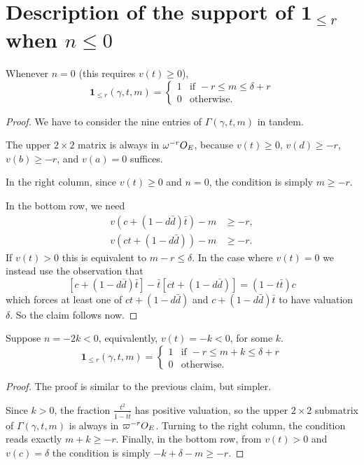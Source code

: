 \section{Description of the support of $\mathbf{1}_{\le r}$ when $n \le 0$}
\begin{proposition}
  Whenever $n = 0$ (this requires $v(t) \geq 0$),
  \[
    \mathbf{1}_{\le r}(\gamma, t, m) =
    \begin{cases}
      1 & \text{if } -r \le m \le \delta+r \\
      0 & \text{otherwise.}
    \end{cases}
  \]
\end{proposition}
\begin{proof}
  We have to consider the nine entries of $\Gamma(\gamma, t, m)$ in tandem.

  The upper $2 \times 2$ matrix is always in $\omega^{-r}O_E$,
  because $v(t) \geq 0$, $v(d) \geq -r$, $v(b) \geq -r$, and $v(a) = 0$ suffices.

  In the right column, since $v(t) \geq 0$ and $n = 0$, the condition is simply $m \ge -r$.

  In the bottom row, we need
  \begin{align*}
    v\left( c+(1-d\bar d) \bar t \right)-m &\geq -r, \\
    v\left( ct +(1-d\bar d) \right)-m &\geq -r.
  \end{align*}
  If $v(t) > 0$ this is equivalent to $m-r \leq \delta$.
  In the case where $v(t) = 0$ we instead use the observation that
  \begin{equation}
    \left[ c + (1-d \bar d) \bar t \right]
    - \bar t \left[ ct + (1-d \bar d) \right] = (1-t\bar t) c
    \label{eq:ctrick}
  \end{equation}
  which forces at least one of $ct + (1-d \bar d)$ and $c + (1-d \bar d) \bar t$ to
  have valuation $\delta$. So the claim follows now.
\end{proof}

\begin{proposition}
  Suppose $n = -2k < 0$, equivalently, $v(t) = -k < 0$, for some $k$.
  \[
    \mathbf{1}_{\le r}(\gamma, t, m) =
    \begin{cases}
      1 & \text{if } -r \le m+k \le \delta+r \\
      0 & \text{otherwise.}
    \end{cases}
  \]
\end{proposition}
\begin{proof}
  The proof is similar to the previous claim, but simpler.

  Since $k > 0$, the fraction $\frac{t^2}{1-t \bar t}$ has positive valuation,
  so the upper $2 \times 2$ submatrix of $\Gamma(\gamma, t, m)$ is always in $\varpi^{-r}O_E$.
  Turning to the right column, the condition reads exactly $m+k \geq -r$.
  Finally, in the bottom row, from $v(t) > 0$ and $v(c) = \delta$
  the condition is simply $-k+\delta-m \geq -r$.
\end{proof}

